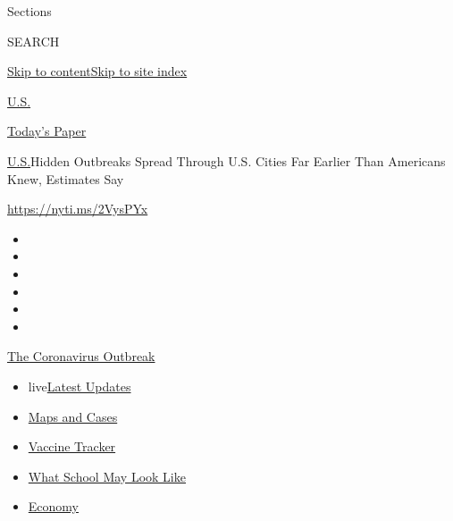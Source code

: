 Sections

SEARCH

\protect\hyperlink{site-content}{Skip to
content}\protect\hyperlink{site-index}{Skip to site index}

\href{https://www.nytimes.com/section/us}{U.S.}

\href{https://myaccount.nytimes.com/auth/login?response_type=cookie\&client_id=vi}{}

\href{https://www.nytimes.com/section/todayspaper}{Today's Paper}

\href{/section/us}{U.S.}\textbar{}Hidden Outbreaks Spread Through U.S.
Cities Far Earlier Than Americans Knew, Estimates Say

\url{https://nyti.ms/2VysPYx}

\begin{itemize}
\item
\item
\item
\item
\item
\item
\end{itemize}

\href{https://www.nytimes.com/news-event/coronavirus?action=click\&pgtype=Article\&state=default\&region=TOP_BANNER\&context=storylines_menu}{The
Coronavirus Outbreak}

\begin{itemize}
\tightlist
\item
  live\href{https://www.nytimes.com/2020/08/02/world/coronavirus-updates.html?action=click\&pgtype=Article\&state=default\&region=TOP_BANNER\&context=storylines_menu}{Latest
  Updates}
\item
  \href{https://www.nytimes.com/interactive/2020/us/coronavirus-us-cases.html?action=click\&pgtype=Article\&state=default\&region=TOP_BANNER\&context=storylines_menu}{Maps
  and Cases}
\item
  \href{https://www.nytimes.com/interactive/2020/science/coronavirus-vaccine-tracker.html?action=click\&pgtype=Article\&state=default\&region=TOP_BANNER\&context=storylines_menu}{Vaccine
  Tracker}
\item
  \href{https://www.nytimes.com/interactive/2020/07/29/us/schools-reopening-coronavirus.html?action=click\&pgtype=Article\&state=default\&region=TOP_BANNER\&context=storylines_menu}{What
  School May Look Like}
\item
  \href{https://www.nytimes.com/live/2020/07/31/business/stock-market-today-coronavirus?action=click\&pgtype=Article\&state=default\&region=TOP_BANNER\&context=storylines_menu}{Economy}
\end{itemize}

